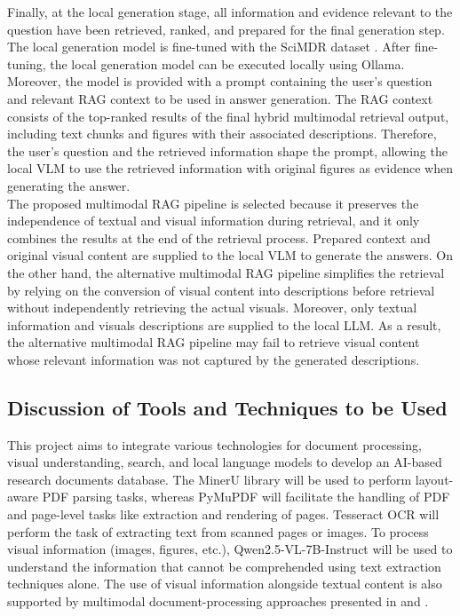 \documentclass[11pt,a4paper]{report}
\begin{document}
Finally, at the local generation stage, all information and evidence relevant to the question have been retrieved, ranked, and prepared for the final generation step. The local generation model is fine-tuned with the SciMDR dataset \cite{Chen2026SciMDRAS}. After fine-tuning, the local generation model can be executed locally using Ollama. Moreover, the model is provided with a prompt containing the user’s question and relevant \ac{RAG} context to be used in answer generation. The \ac{RAG} context consists of the top-ranked results of the final hybrid multimodal retrieval output, including text chunks and figures with their associated descriptions. Therefore, the user’s question and the retrieved information shape the prompt, allowing the local \ac{VLM} to use the retrieved information with original figures as evidence when generating the answer.\\

The proposed multimodal \ac{RAG} pipeline is selected because it preserves the independence of textual and visual information during retrieval, and it only combines the results at the end of the retrieval process. Prepared context and original visual content are supplied to the local \ac{VLM} to generate the answers. On the other hand, the alternative multimodal \ac{RAG} pipeline simplifies the retrieval by relying on the conversion of visual content into descriptions before retrieval without independently retrieving the actual visuals. Moreover, only textual information and visuals descriptions are supplied to the local \ac{LLM}. As a result, the alternative multimodal \ac{RAG} pipeline may fail to retrieve visual content whose relevant information was not captured by the generated descriptions.

\subsection{Discussion of Tools and Techniques to be Used}
This project aims to integrate various technologies for document processing, visual understanding, search, and local language models to develop an \ac{AI}-based research documents database. The MinerU library \cite{Wang2024MinerUAO} will be used to perform layout-aware \ac{PDF} parsing tasks, whereas PyMuPDF \cite{artifex2026pymupdf} will facilitate the handling of \ac{PDF} and page-level tasks like extraction and rendering of pages. Tesseract \ac{OCR} \cite{Smith2007AnOO} will perform the task of extracting text from scanned pages or images. To process visual information (images, figures, etc.), Qwen2.5-VL-7B-Instruct \cite{Bai2025Qwen25VLTR} will be used to understand the information that cannot be comprehended using text extraction techniques alone. The use of visual information alongside textual content is also supported by multimodal document-processing approaches presented in \cite{Tanaka2025VDocRAGRG} and \cite{Chandrasekhar2026MaterialDA}.\\
\end{document}
